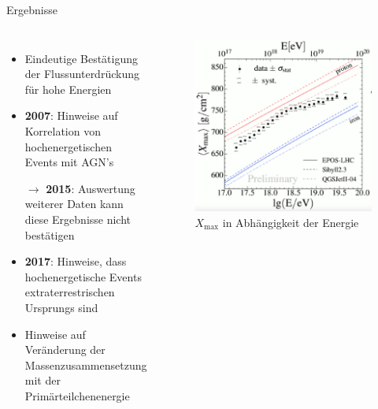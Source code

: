 \documentclass[aspectratio=1610, professionalfonts, 9pt, hyperref={colorlinks=false}]{beamer}
\begin{document}
\begin{frame}{Ergebnisse}
  \begin{columns}
      \begin{itemize}
        \setlength\itemsep{0.5em}
        \item Eindeutige Bestätigung der Flussunterdrückung für hohe Energien
        \item \textbf{2007}: Hinweise auf Korrelation von hochenergetischen Events mit AGN's
        \item[$\rightarrow$] \textbf{2015}: Auswertung weiterer Daten kann diese Ergebnisse nicht bestätigen
        \item \textbf{2017}: Hinweise, dass hochenergetische Events extraterrestrischen Ursprungs sind
        \item Hinweise auf Veränderung der Massenzusammensetzung mit der Primärteilchenenergie
      \end{itemize}
        \vspace*{10px}
  
      \begin{figure}
          \centering
          \includegraphics[width=0.8\linewidth]{images/auger_mass}
          \caption{$X_\text{max}$ in Abhängigkeit der Energie \cite{Buscemi:2018ohy}}
      \end{figure}
  \end{columns}
\end{frame}
\end{document}
